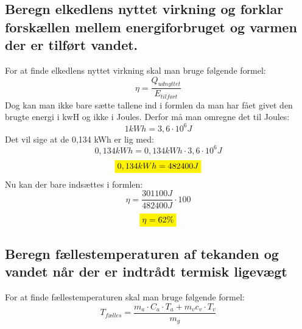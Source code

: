 \subsection{Beregn elkedlens nyttet virkning og forklar forskællen mellem energiforbruget og varmen der er tilført vandet.}
For at finde elkedlens nyttet virkning skal man bruge følgende formel: 
\begin{equation*}
    \eta=\frac{Q_{udnyttet}}{E_{tilført}}
\end{equation*}
Dog kan man ikke bare sætte tallene ind i formlen da man har fået givet den brugte energi i kwH og ikke i Joules. 
Derfor må man omregne det til Joules:
\begin{equation*}
    1 kWh=3,6 \cdot 10^6 J
\end{equation*}
Det vil sige at de 0,134 kWh er lig med:
\begin{equation*}
    0,134 kWh=0,134 kWh \cdot 3,6 \cdot 10^6 J
\end{equation*}
\begin{equation*}
    \mathcolorbox{yellow}{0,134 kWh=482400 J}
\end{equation*}
Nu kan der bare indsættes i formlen:
\begin{equation*}
    \eta=\frac{301100 J}{482400 J}\cdot 100
\end{equation*}
\begin{equation*}
    \mathcolorbox{yellow}{\eta=62\%}
\end{equation*}

\subsection{Beregn fællestemperaturen af tekanden og vandet når der er indtrådt termisk ligevægt}
For at finde fællestemperaturen skal man bruge følgende formel:
\begin{equation*}
    T_{fælles}= \frac{m_a \cdot C_a \cdot T_a + m_v c_v \cdot T_v}{m_g}
\end{equation*} %

\newpage